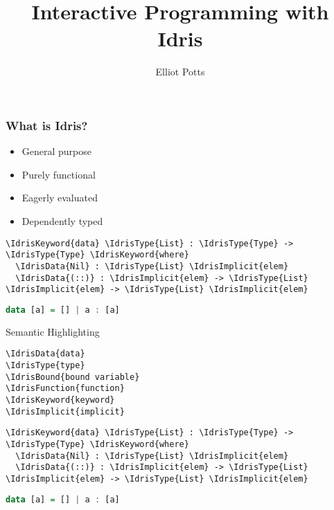 \documentclass[xetex,xcolor={usenames,dvipsnames},mathserif,serif,17pt]{beamer}
\newcommand{\IdrisData}[1]{\textcolor{red}{#1}}
\newcommand{\IdrisType}[1]{\textcolor{blue}{#1}}
\newcommand{\IdrisBound}[1]{\textcolor{violet}{#1}}
\newcommand{\IdrisFunction}[1]{\textcolor{OliveGreen}{#1}}
\newcommand{\IdrisKeyword}[1]{{\underline{#1}}}
\newcommand{\IdrisImplicit}[1]{{\itshape \IdrisBound{#1}}}
\begin{document}
\title{Interactive Programming with Idris}
\author{Elliot Potts}
\frame{\titlepage}
\begin{frame}
  \frametitle{What is Idris?}
  \begin{itemize}
  \item General purpose
  \item Purely functional
  \item Eagerly evaluated
  \item Dependently typed
  \end{itemize}
\end{frame}

\fontsize{11}{11}\selectfont
\begin{frame}[fragile]
\begin{Verbatim}[commandchars=\\\{\}]
\IdrisKeyword{data} \IdrisType{List} : \IdrisType{Type} -> \IdrisType{Type} \IdrisKeyword{where}
  \IdrisData{Nil} : \IdrisType{List} \IdrisImplicit{elem}
  \IdrisData{(::)} : \IdrisImplicit{elem} -> \IdrisType{List} \IdrisImplicit{elem} -> \IdrisType{List} \IdrisImplicit{elem}
\end{Verbatim}
\begin{lstlisting}[language=haskell]
data [a] = [] | a : [a]
\end{lstlisting}
\end{frame}

\begin{frame}[fragile]
  \begin{block}{Semantic Highlighting}
\begin{Verbatim}[commandchars=\\\{\}]
\IdrisData{data}
\IdrisType{type}
\IdrisBound{bound variable}
\IdrisFunction{function}
\IdrisKeyword{keyword}
\IdrisImplicit{implicit}
\end{Verbatim}
  \end{block}
\begin{Verbatim}[commandchars=\\\{\}]
\IdrisKeyword{data} \IdrisType{List} : \IdrisType{Type} -> \IdrisType{Type} \IdrisKeyword{where}
  \IdrisData{Nil} : \IdrisType{List} \IdrisImplicit{elem}
  \IdrisData{(::)} : \IdrisImplicit{elem} -> \IdrisType{List} \IdrisImplicit{elem} -> \IdrisType{List} \IdrisImplicit{elem}
\end{Verbatim}
\begin{lstlisting}[language=haskell]
data [a] = [] | a : [a]
\end{lstlisting}
\end{frame}
\end{document}
